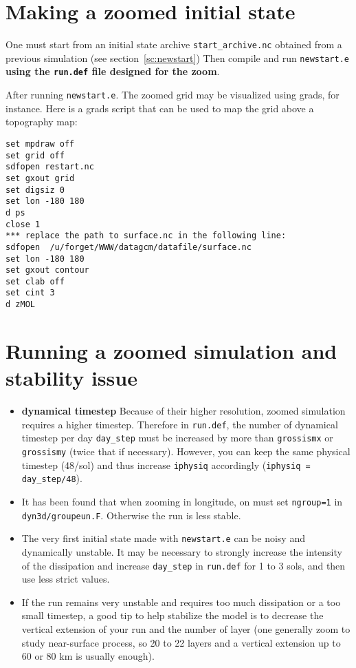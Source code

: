 \section{Making a zoomed initial state}

One must start from an initial state archive {\tt start\_archive.nc}
obtained from a previous
simulation (see section~\ref{sc:newstart})
Then compile and run {\tt newstart.e} {\bf using the {\tt run.def}
file designed for the zoom}.

After running {\tt newstart.e}. The zoomed grid may be visualized
using grads, for instance.
Here is a grads script that can be used to map the grid above a topography
map:

\begin{verbatim}
set mpdraw off
set grid off
sdfopen restart.nc
set gxout grid
set digsiz 0
set lon -180 180
d ps
close 1
*** replace the path to surface.nc in the following line:
sdfopen  /u/forget/WWW/datagcm/datafile/surface.nc
set lon -180 180
set gxout contour
set clab off
set cint 3
d zMOL
\end{verbatim}


\section{Running a zoomed simulation and stability issue}

\begin{itemize}

\item {\bf dynamical timestep}
Because of their higher resolution, zoomed simulation requires a higher
timestep.
Therefore in {\tt run.def}, the number of dynamical timestep per day
{\tt day\_step} must be increased by more than {\tt grossismx} or
{\tt grossismy} (twice that if necessary).
However, you can keep the same physical timestep (48/sol) and thus increase
 {\tt iphysiq} accordingly ({\tt iphysiq = day\_step/48}).

\item It has been found that when zooming in longitude, on must set
{\tt ngroup=1} in
{\tt dyn3d/groupeun.F}. Otherwise the run is less stable.

\item The very first initial state made with {\tt newstart.e} can be noisy and
dynamically unstable.
It may be necessary to strongly increase the intensity of the
dissipation and increase {\tt day\_step} in {\tt run.def} for 1 to 3 sols,
and then use less strict values. 

\item If the run remains very unstable and requires too much dissipation
or a too small timestep, a good tip to help stabilize the model
is to decrease the vertical extension of your run and the number of
layer (one generally zoom to study near-surface process, so 20 to 22
layers and a vertical extension up to 60 or 80 km is usually enough).

\end{itemize}













 



